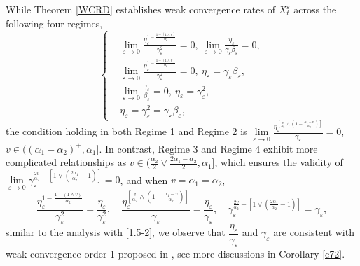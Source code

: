 \documentclass[11pt,reqno]{amsart}
\numberwithin{equation}{section}
\begin{document}
While Theorem \ref{WCRD} establishes weak convergence rates of $X_{t}^{\varepsilon}$ across the following four regimes,
\begin{equation}\label{1.1-2}
	\left\{
	\begin{aligned}
		&\lim\limits_{\varepsilon \rightarrow0} \frac{\eta_{\varepsilon}^{1-\frac{1-(1\wedge v)}{\alpha_{2}}}}{\gamma_{\varepsilon}^{2}}=0,\ \lim\limits_{\varepsilon \rightarrow0}\frac{\eta_{\varepsilon}}{\gamma_{\varepsilon}\beta_{\varepsilon} }=0,\\
		&\lim\limits_{\varepsilon \rightarrow0} \frac{\eta_{\varepsilon}^{1-\frac{1-(1\wedge v)}{\alpha_{2}}}}{\gamma_{\varepsilon}^{2}}=0,\ \eta_{\varepsilon}=\gamma_{\varepsilon}\beta_{\varepsilon},\\
		& \lim\limits_{\varepsilon \rightarrow0}\frac{\gamma_{\varepsilon}}{\beta_{\varepsilon}}=0,\ \eta_{\varepsilon}=\gamma_{\varepsilon}^{2},\\
		&\eta_{\varepsilon}=\gamma_{\varepsilon}^{2}=\gamma_{\varepsilon}\beta_{\varepsilon},
	\end{aligned}
	\right.
\end{equation}
the condition holding in both Regime 1 and Regime 2 is 
 $ \lim\limits_{\varepsilon \rightarrow0}\frac{ \eta_{\varepsilon}^{\left[ \frac{v}{\alpha_{2}}\wedge \left( 1-\frac{\alpha_{1}-v}{\alpha_{2}} \right)\right]  }}{\gamma_{\varepsilon}}=0$, $v\in((\alpha_{1}-\alpha_{2})^{+},\alpha_{1}]$.
In contrast, Regime 3 and Regime 4 exhibit more complicated  relationships as $v\in ( \frac{\alpha_{2}}{2}\vee \frac{2\alpha_{1}-\alpha_{2}}{2}  ,\alpha_{1}]$, which ensures the validity of  $\lim\limits_{\varepsilon \rightarrow0}\gamma_{\varepsilon}^{\frac{2v}{\alpha_{2}}-\left[ 1\vee \left( \frac{2\alpha_{1}}{\alpha_{2}}-1\right)   \right] }=0$, and when $v=\alpha_{1}=\alpha_{2}$, 
\begin{equation}
	\frac{\eta_{\varepsilon}^{1-\frac{1-(1\wedge v)}{\alpha_{2}}}}{\gamma_{\varepsilon}^{2}}= \frac{\eta_{\varepsilon}}{\gamma_{\varepsilon}^{2}},\quad  
	\frac{ \eta_{\varepsilon}^{\left[ \frac{v}{\alpha_{2}}\wedge \left( 1-\frac{\alpha_{1}-v}{\alpha_{2}} \right)\right]  }}{\gamma_{\varepsilon}}=\frac{\eta_{\varepsilon}}{\gamma_{\varepsilon}},\quad \gamma_{\varepsilon}^{\frac{2v}{\alpha_{2}}-\left[ 1\vee \left( \frac{2\alpha_{1}}{\alpha_{2}}-1\right)   \right] }=\gamma_{\varepsilon},\nonumber
\end{equation}
similar to the analysis with \eqref{1.5-2}, we observe that $\dfrac{\eta_{\varepsilon}}{\gamma_{\varepsilon}}$ and $\gamma_{\varepsilon}$ are consistent with weak convergence order 1 %
proposed in \cite{SXX}, see more discussions in Corollary \ref{c72}.
\end{document}

